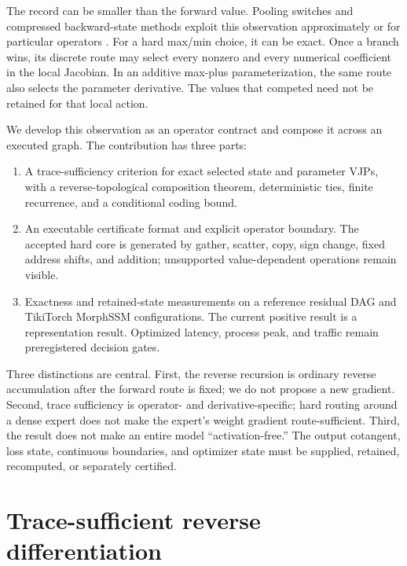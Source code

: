 \documentclass[10pt]{article}
\begin{document}
The record can be smaller than the forward value.  Pooling switches and
compressed backward-state methods exploit this observation approximately or
for particular operators \citep{zeiler2014visualizing,jain2018gist,novikov2023fewbit}.
For a hard max/min choice, it can be exact.  Once a branch wins, its discrete
route may select every nonzero and every numerical coefficient in the local
Jacobian.  In an additive max-plus parameterization, the same route also
selects the parameter derivative.  The values that competed need not be
retained for that local action.

We develop this observation as an operator contract and compose it across an
executed graph.  The contribution has three parts:

\begin{enumerate}[leftmargin=1.5em]
  \item A trace-sufficiency criterion for exact selected state and parameter
  VJPs, with a reverse-topological composition theorem, deterministic ties,
  finite recurrence, and a conditional coding bound.
  \item An executable certificate format and explicit operator boundary.  The
  accepted hard core is generated by gather, scatter, copy, sign change, fixed
  address shifts, and addition; unsupported value-dependent operations remain
  visible.
  \item Exactness and retained-state measurements on a reference residual DAG
  and TikiTorch MorphSSM configurations.  The current positive result is a
  representation result.  Optimized latency, process peak, and traffic remain
  preregistered decision gates.
\end{enumerate}

Three distinctions are central.  First, the reverse recursion is ordinary
reverse accumulation after the forward route is fixed; we do not propose a new
gradient.  Second, trace sufficiency is operator- and derivative-specific;
hard routing around a dense expert does not make the expert's weight gradient
route-sufficient.  Third, the result does not make an entire model
``activation-free.''  The output cotangent, loss state, continuous boundaries,
and optimizer state must be supplied, retained, recomputed, or separately
certified.

\section{Trace-sufficient reverse differentiation}
\end{document}
